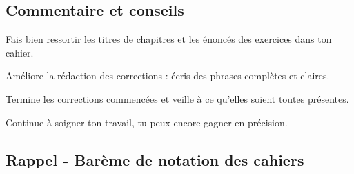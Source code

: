 \documentclass[answers]{exam}
\begin{document}
\subsection*{Commentaire et conseils}

\begin{tcolorbox}[
  colback=blue!5!white,
  colframe=blue!70!black,
  title=Commentaire plus détaillé,
  fonttitle=\bfseries,
  boxsep=4pt,
  sharp corners,
]
\begin{compactitem}
  \item Fais bien ressortir les titres de chapitres et les énoncés des exercices dans ton cahier.
  \item Améliore la rédaction des corrections : écris des phrases complètes et claires.
  \item Termine les corrections commencées et veille à ce qu'elles soient toutes présentes.
  \item Continue à soigner ton travail, tu peux encore gagner en précision.
\end{compactitem}
\end{tcolorbox}



\subsection*{Rappel - Barème de notation des cahiers}

\renewcommand{\arraystretch}{1.7}
\end{document}
